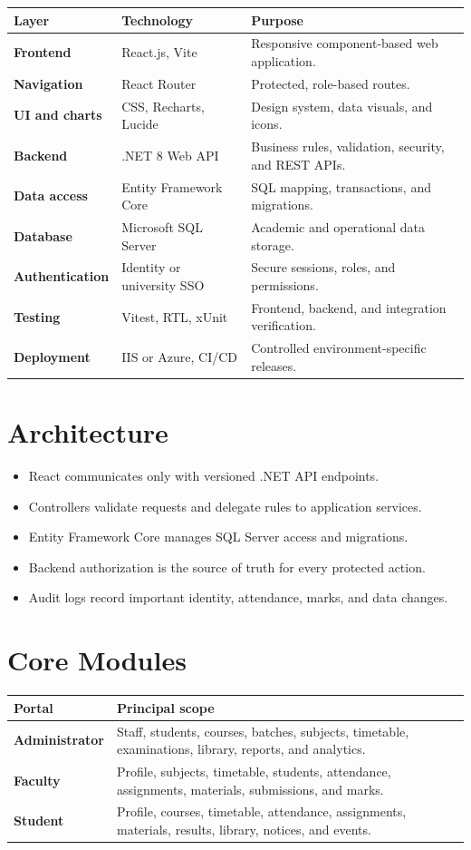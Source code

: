\documentclass[10pt,a4paper]{article}
\begin{document}
\renewcommand{\arraystretch}{1.3}
\begin{tabularx}{\textwidth}{>{\bfseries}p{3.2cm} p{4cm} X}
\toprule
Layer & Technology & Purpose \\
\midrule
Frontend & React.js, Vite & Responsive component-based web application. \\
Navigation & React Router & Protected, role-based routes. \\
UI and charts & CSS, Recharts, Lucide & Design system, data visuals, and icons. \\
Backend & .NET 8 Web API & Business rules, validation, security, and REST APIs. \\
Data access & Entity Framework Core & SQL mapping, transactions, and migrations. \\
Database & Microsoft SQL Server & Academic and operational data storage. \\
Authentication & Identity or university SSO & Secure sessions, roles, and permissions. \\
Testing & Vitest, RTL, xUnit & Frontend, backend, and integration verification. \\
Deployment & IIS or Azure, CI/CD & Controlled environment-specific releases. \\
\bottomrule
\end{tabularx}

\section{Architecture}

\begin{itemize}
  \item React communicates only with versioned .NET API endpoints.
  \item Controllers validate requests and delegate rules to application services.
  \item Entity Framework Core manages SQL Server access and migrations.
  \item Backend authorization is the source of truth for every protected action.
  \item Audit logs record important identity, attendance, marks, and data changes.
\end{itemize}

\section{Core Modules}

\begin{tabularx}{\textwidth}{>{\bfseries}p{3.2cm} X}
\toprule
Portal & Principal scope \\
\midrule
Administrator & Staff, students, courses, batches, subjects, timetable,
examinations, library, reports, and analytics. \\
Faculty & Profile, subjects, timetable, students, attendance, assignments,
materials, submissions, and marks. \\
Student & Profile, courses, timetable, attendance, assignments, materials,
results, library, notices, and events. \\
\bottomrule
\end{tabularx}
\end{document}

